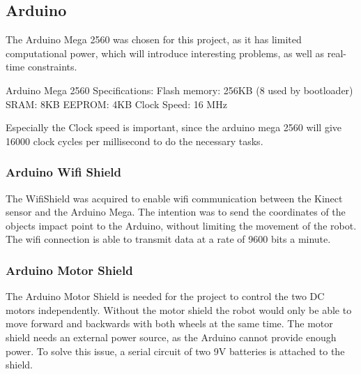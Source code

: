 
\subsection{Arduino}
\label{sec:Arduino}
The Arduino Mega 2560 was chosen for this project, as it has limited computational power, which will introduce interesting problems, as well as real-time constraints. \citep{a}

Arduino Mega 2560 Specifications:\newline
Flash memory: 256KB (8 used by bootloader)\newline
SRAM: 8KB\newline
EEPROM: 4KB\newline
Clock Speed: 16 MHz\newline

Especially the Clock speed is important, since the arduino mega 2560  will give 16000 clock cycles per millisecond to do the necessary tasks.

\subsubsection{Arduino Wifi Shield}
\label{sec: Arduino Wifi Shield}
The WifiShield was acquired to enable wifi communication between the Kinect sensor and the Arduino Mega. The intention was to send the coordinates of the objects impact point to the Arduino, without limiting the movement of the robot. The wifi connection is able to transmit data at a rate of 9600 bits a minute. 
\citep{aws}

\subsubsection{Arduino Motor Shield}
\label{sec:Arduino Motor Shield}
The Arduino Motor Shield is needed for the project to control the two DC motors independently. Without the motor shield the robot would only be able to move forward and backwards with both wheels at the same time. 
The motor shield needs an external power source, as the Arduino cannot provide enough power. To solve this issue, a serial circuit of two 9V batteries is attached to the shield. \citep{ams}

